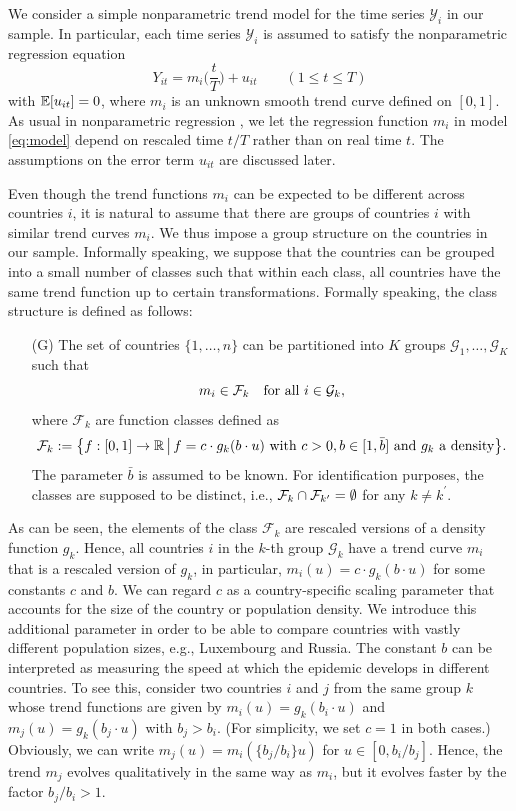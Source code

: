 \documentclass[a4paper,12pt]{article}
\numberwithin{equation}{section}
\begin{document}
We consider a simple nonparametric trend model for the time series $\mathcal{Y}_i$ in our sample. In particular, each time series $\mathcal{Y}_i$ is assumed to satisfy the nonparametric regression equation
\begin{equation}\label{eq:model}
Y_{it} = m_i\Big(\frac{t}{T}\Big) + u_{it} \qquad (1 \le t \le T) 
\end{equation}
with $\mathbb{E}[u_{it}]= 0$, where $m_i$ is an unknown smooth trend curve defined on $[0,1]$. As usual in nonparametric regression \citep[see e.g.][]{Robinson1989}, we let the regression function $m_i$ in model \eqref{eq:model} depend on rescaled time $t/T$ rather than on real time $t$. The assumptions on the error term $u_{it}$ are discussed later. 


Even though the trend functions $m_i$ can be expected to be different across countries $i$, it is natural to assume that there are groups of countries $i$ with similar trend curves $m_i$. We thus impose a group structure on the countries in our sample. Informally speaking, we suppose that the countries can be grouped into a small number of classes such that within each class, all countries have the same trend function up to certain transformations. Formally speaking, the class structure is defined as follows: 
\begin{enumerate}[leftmargin=0.8cm]
\item[(G)] The set of countries $\{1,\ldots,n\}$ can be partitioned into $K$ groups $\mathcal{G}_1,\ldots,\mathcal{G}_K$ such that 
\[ m_i \in \mathcal{F}_k \quad \text{for all } i \in \mathcal{G}_k, \]
where $\mathcal{F}_k$ are function classes defined as
\[ \mathcal{F}_k := \big\{ f:[0, 1] \rightarrow \mathbb{R} \,\big|\, f = c \cdot g_k(b \cdot u) \text{ with } c>0, b\in [1, \bar{b}] \text{ and } g_k \text{ a density} \big\}. \]
The parameter $\bar{b}$ is assumed to be known. For identification purposes, the classes are supposed to be distinct, i.e., $\mathcal{F}_k \cap \mathcal{F}_{k^\prime} = \emptyset$ for any $k \neq k^\prime$. 
\end{enumerate}
As can be seen, the elements of the class $\mathcal{F}_k$ are rescaled versions of a density function $g_k$. Hence, all countries $i$ in the $k$-th group $\mathcal{G}_k$ have a trend curve $m_i$ that is a rescaled version of $g_k$, in particular, $m_i(u) = c \cdot g_k(b \cdot u)$ for some constants $c$ and $b$. We can regard $c$ as a country-specific scaling parameter that accounts for the size of the country or population density. We introduce this additional parameter in order to be able to compare countries with vastly different population sizes, e.g., Luxembourg and Russia. The constant $b$ can be interpreted as measuring the speed at which the epidemic develops in different countries. To see this, consider two countries $i$ and $j$ from the same group $k$ whose trend functions are given by $m_i(u) = g_k(b_i \cdot u)$ and $m_j(u) = g_k(b_j \cdot u)$ with $b_j > b_i$. (For simplicity, we set $c = 1$ in both cases.) Obviously, we can write $m_j(u) = m_i(\{b_j/b_i\} u)$ for $u \in [0,b_i/b_j]$. Hence, the trend $m_j$ evolves qualitatively in the same way as $m_i$, but it evolves faster by the factor $b_j/b_i > 1$. 
\end{document}
